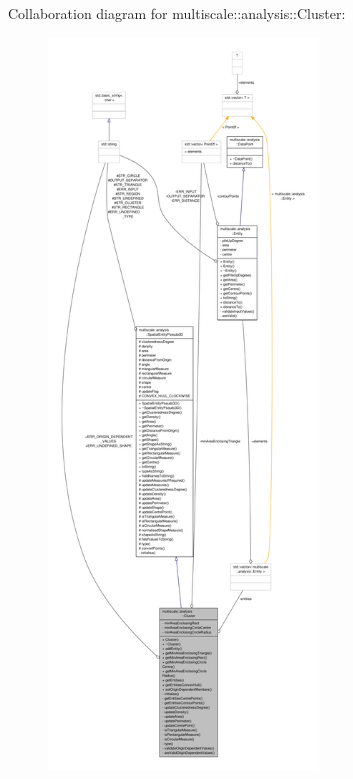 Collaboration diagram for multiscale\-:\-:analysis\-:\-:Cluster\-:\nopagebreak
\begin{figure}[H]
\begin{center}
\leavevmode
\includegraphics[height=550pt]{classmultiscale_1_1analysis_1_1Cluster__coll__graph}
\end{center}
\end{figure}
